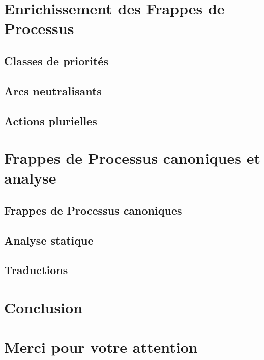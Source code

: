 \documentclass[fleqn,8pt,t]{beamer}
\begin{document}



\section{Enrichissement des Frappes de Processus}

\subsection{Classes de priorités}


\subsection{Arcs neutralisants}


\subsection{Actions plurielles}



\section{Frappes de Processus canoniques et analyse}
\subsection{Frappes de Processus canoniques}


\subsection{Analyse statique}

\subsection{Traductions}




\section{Conclusion}

\section[x]{Merci pour votre attention}


\appendix
{}
\setcounter{finalframe}{\value{framenumber}}
\end{document}
